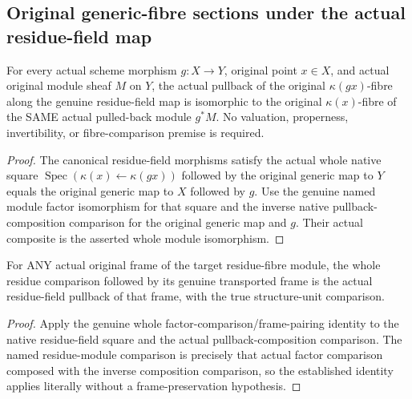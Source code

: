 \subsection{Original generic-fibre sections under the actual residue-field map}

\begin{definition}
\label{berkovich:actual-residue-module-pullback-iso}
\leanok
For every actual scheme morphism $g:X\to Y$, original point $x\in X$, and
actual original module sheaf $M$ on $Y$, the actual pullback of the original
$\kappa(gx)$-fibre along the genuine residue-field map is isomorphic to the
original $\kappa(x)$-fibre of the SAME actual pulled-back module $g^*M$.
No valuation, properness, invertibility, or fibre-comparison premise is required.
\end{definition}
\begin{proof}
The canonical residue-field morphisms satisfy the actual whole native square
$\operatorname{Spec}(\kappa(x)\leftarrow\kappa(gx))$ followed by the original
generic map to $Y$ equals the original generic map to $X$ followed by $g$.
Use the genuine named module factor isomorphism for that square and the inverse
native pullback-composition comparison for the original generic map and $g$.
Their actual composite is the asserted whole module isomorphism.
\end{proof}

\begin{lemma}
\label{berkovich:actual-residue-module-pullback-frame}
\leanok
{}
For ANY actual original frame of the target residue-fibre module, the whole
residue comparison followed by its genuine transported frame is the actual
residue-field pullback of that frame, with the true structure-unit comparison.
\end{lemma}
\begin{proof}
Apply the genuine whole factor-comparison/frame-pairing identity to the native
residue-field square and the actual pullback-composition comparison. The named
residue-module comparison is precisely that actual factor comparison composed
with the inverse composition comparison, so the established identity applies
literally without a frame-preservation hypothesis.
\end{proof}


